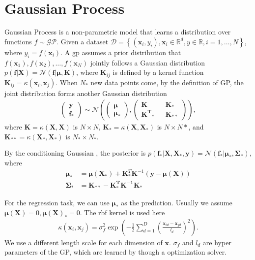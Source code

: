 \section{Gaussian Process}
\label{sec:gp}
Gaussian Process is a non-parametric model that learns a distribution over functions $f\sim \mathcal{GP}$.
Given a dataset 
$\mathcal{D} = \left\{(\mathbf{x}_i, y_i), \mathbf{x}_i \in \mathbb{R}^d, y \in \mathbb{R}, i=1,\dots, N \right\}$, 
where $y_{i} = f(\mathbf{x}_i)$.
A \gls{gp} assumes a prior distribution that 
$f(\mathbf{x}_{1}), f(\mathbf{x}_{2}), \dots, f(\mathbf{x}_{N})$ 
jointly follows a Gaussian distribution $p(\mathbf{f}|\mathbf{X}) = \mathcal{N}(\mathbf{f}|\mathbf{\mu}, \mathbf{K})$,
where $\mathbf{K}_{ij}$ is defined by a kernel function $\mathbf{K}_{ij} = \kappa(\mathbf{x}_i, \mathbf{x}_j)$.
When $N_{*}$ new data points come, by the definition of GP, the joint distribution forms another Gaussian distribution
\begin{align}
\begin{pmatrix} \mathbf{y}\\ \mathbf{f_*}\end{pmatrix} \sim \mathcal{N}\left(
\begin{pmatrix} \mathbf{\mu} \\ \mathbf{\mu}_{*}\end{pmatrix}, 
\begin{pmatrix} \mathbf{K} && \mathbf{K}_*\\ \mathbf{K^T}_* && \mathbf{K}_{**}\end{pmatrix}
\right),
\end{align}
where $\mathbf{K}=\kappa(\mathbf{X}, \mathbf{X})$ is $N\times N$, $\mathbf{K}_*=\kappa(\mathbf{X}, \mathbf{X}_*)$ is $N\times N{*}$, and $\mathbf{K}_{**}=\kappa(\mathbf{X}_*, \mathbf{X}_*)$ is $N_*\times N_*$.

By the conditioning Gaussian \cite{rasmussen2003gaussian}, the posterior is $p(\mathbf{f}_*|\mathbf{X}, \mathbf{X}_*, \mathbf{y}) = \mathcal{N}(\mathbf{f}_*|\mathbf{\mu}_*, \mathbf{\Sigma}_*)$, where
\begin{align}
\mathbf{\mu}_* & = \mathbf{\mu(X_*)} + \mathbf{K}^T_*\mathbf{K}^{-1}(\mathbf{y-\mu(X)})\label{eq:gp-mu}\\
\mathbf{\Sigma}_* & = \mathbf{K_{**}-K_*^TK^{-1}K_*}
\label{eq:gp-cov}
\end{align}

For the regression task, we can use $\mathbf{\mu}_*$ as the prediction.
Usually we assume $\mathbf{\mu(X)} = 0, \mathbf{\mu(X)}_* = 0$. The \gls{rbf} kernel is used here
\begin{align}
\kappa(\mathbf{x}_i, \mathbf{x}_j) = \sigma_f^2 \exp\left(-\frac{1}{2}\sum_{d=1}^{D}\left(\frac{\mathbf{x}_{id}-\mathbf{x}_{jd}}{l_d}\right)^2\right).
\end{align}
We use a different length scale for each dimension of $\mathbf{x}$.
$\sigma_{f}$ and $l_{d}$ are hyper parameters of the GP, which are learned by though a optimization solver.

